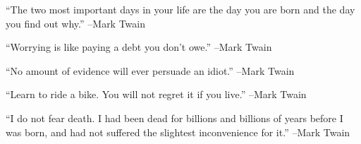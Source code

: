 \documentclass{article}%
\begin{document}
\linebreak%
\vspace{1mm}%
\begin{minipage}{\textwidth}%
\flushleft%
“The two most important days in your life are the day you are born and the day you find out why.”%
\linebreak%
\vspace{1mm}%
–Mark Twain%
\linebreak%
\vspace{1mm}%
\end{minipage}%
\linebreak%
\vspace{1mm}%
\begin{minipage}{\textwidth}%
\flushleft%
“Worrying is like paying a debt you don't owe.”%
\linebreak%
\vspace{1mm}%
–Mark Twain%
\linebreak%
\vspace{1mm}%
\end{minipage}%
\linebreak%
\vspace{1mm}%
\begin{minipage}{\textwidth}%
\flushleft%
“No amount of evidence will ever persuade an idiot.”%
\linebreak%
\vspace{1mm}%
–Mark Twain%
\linebreak%
\vspace{1mm}%
\end{minipage}%
\linebreak%
\vspace{1mm}%
\begin{minipage}{\textwidth}%
\flushleft%
“Learn to ride a bike. You will not regret it if you live.”%
\linebreak%
\vspace{1mm}%
–Mark Twain%
\linebreak%
\vspace{1mm}%
\end{minipage}%
\linebreak%
\vspace{1mm}%
\begin{minipage}{\textwidth}%
\flushleft%
“I do not fear death. I had been dead for billions and billions of years before I was born, and had not suffered the slightest inconvenience for it.”%
\linebreak%
\vspace{1mm}%
–Mark Twain%
\linebreak%
\vspace{1mm}%
\end{minipage}%
\end{document}
